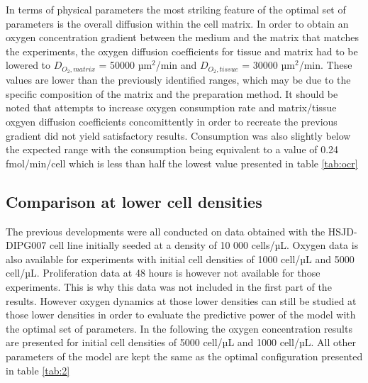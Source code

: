 \documentclass[11pt,a4paper]{article}
\begin{document}
In terms of physical parameters the most striking feature of the optimal set of parameters is the overall diffusion within the cell matrix. In order to obtain an oxygen concentration gradient between the medium and the matrix that matches the experiments, the oxygen diffusion coefficients for tissue and matrix had to be lowered to  $D_{O_2,matrix}$  = 50000 µm$^2$/min and $D_{O_2,tissue}$ = 30000 µm$^2$/min. These values are lower than the previously identified ranges, which may be due to the specific composition of the matrix and the preparation method. It should be noted that attempts to increase oxygen consumption rate and matrix/tissue oxgyen diffusion coefficients concomittently in order to recreate the previous gradient did not yield satisfactory results. Consumption was also slightly below the expected range with the consumption being equivalent to a value of 0.24 fmol/min/cell which is less than half the lowest value presented in table \ref{tab:ocr}

\subsection{Comparison at lower cell densities}
The previous developments were all conducted on data obtained with the HSJD-DIPG007 cell line initially seeded at a density of 10 000 cells/µL. Oxygen data is also available for experiments with initial cell densities of 1000 cell/µL and 5000 cell/µL. Proliferation data at 48 hours is however not available for those experiments. This is why this data was not included in the first part of the results. However oxygen dynamics at those lower densities can still be studied at those lower densities in order to evaluate the predictive power of the model with the optimal set of parameters. In the following the oxygen concentration results are presented for initial cell densities of 5000 cell/µL and 1000 cell/µL. All other parameters of the model are kept the same as the optimal configuration presented in table \ref{tab:2}
\end{document}
